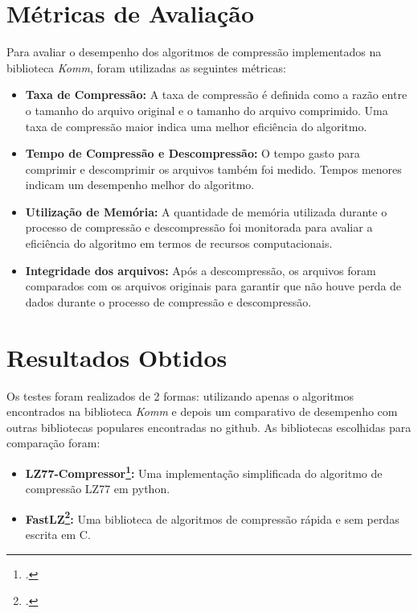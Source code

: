 \pagebreak
\section{Métricas de Avaliação}
Para avaliar o desempenho dos algoritmos de compressão implementados na biblioteca \textit{Komm}, foram utilizadas as seguintes métricas:
\begin{itemize}
    \item \textbf{Taxa de Compressão:} A taxa de compressão é definida como a razão entre o tamanho do arquivo original e o tamanho do arquivo comprimido. Uma taxa de compressão maior indica uma melhor eficiência do algoritmo.
    \item \textbf{Tempo de Compressão e Descompressão:} O tempo gasto para comprimir e descomprimir os arquivos também foi medido. Tempos menores indicam um desempenho melhor do algoritmo.
    \item \textbf{Utilização de Memória:} A quantidade de memória utilizada durante o processo de compressão e descompressão foi monitorada para avaliar a eficiência do algoritmo em termos de recursos computacionais.
    \item \textbf{Integridade dos arquivos: } Após a descompressão, os arquivos foram comparados com os arquivos originais para garantir que não houve perda de dados durante o processo de compressão e descompressão.
\end{itemize}

\section{Resultados Obtidos}
Os testes foram realizados de 2 formas: utilizando apenas o algoritmos encontrados na biblioteca \textit{Komm} e depois um comparativo de desempenho com outras bibliotecas populares encontradas no github. As bibliotecas escolhidas para comparação foram:
\begin{itemize}
    \item \textbf{LZ77-Compressor\footcite{https://github.com/manassra/LZ77-Compressor}:} Uma implementação simplificada do algoritmo de compressão LZ77 em python.
    \item \textbf{FastLZ\footcite{https://github.com/ariya/FastLZ}:} Uma biblioteca de algoritmos de compressão rápida e sem perdas escrita em C.
\end{itemize}


